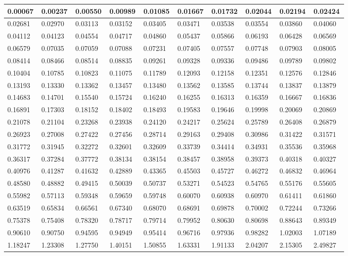 \begin{changemargin}{-4cm}{0cm}\small{%
\begin{tabular}{|p{0.08\linewidth}|p{0.08\linewidth}|p{0.08\linewidth}|p{0.08\linewidth}|p{0.08\linewidth}|p{0.08\linewidth}|p{0.08\linewidth}|p{0.08\linewidth}|p{0.08\linewidth}|p{0.08\linewidth}|}%
\hline%
0.00067&0.00237&0.00550&0.00989&0.01085&0.01667&0.01732&0.02044&0.02194&0.02424\\%
\hline%
0.02681&0.02970&0.03113&0.03152&0.03405&0.03471&0.03538&0.03554&0.03860&0.04060\\%
\hline%
0.04112&0.04123&0.04554&0.04717&0.04860&0.05437&0.05866&0.06193&0.06428&0.06569\\%
\hline%
0.06579&0.07035&0.07059&0.07088&0.07231&0.07405&0.07557&0.07748&0.07903&0.08005\\%
\hline%
0.08414&0.08466&0.08514&0.08835&0.09261&0.09328&0.09336&0.09486&0.09789&0.09802\\%
\hline%
0.10404&0.10785&0.10823&0.11075&0.11789&0.12093&0.12158&0.12351&0.12576&0.12846\\%
\hline%
0.13193&0.13330&0.13362&0.13457&0.13480&0.13562&0.13585&0.13744&0.13837&0.13879\\%
\hline%
0.14683&0.14701&0.15540&0.15724&0.16240&0.16255&0.16313&0.16359&0.16667&0.16836\\%
\hline%
0.16891&0.17303&0.18152&0.18402&0.18493&0.19583&0.19646&0.19998&0.20069&0.20869\\%
\hline%
0.21078&0.21104&0.23268&0.23938&0.24120&0.24217&0.25624&0.25789&0.26408&0.26879\\%
\hline%
0.26923&0.27008&0.27422&0.27456&0.28714&0.29163&0.29408&0.30986&0.31422&0.31571\\%
\hline%
0.31772&0.31945&0.32272&0.32601&0.32609&0.33739&0.34414&0.34931&0.35536&0.35968\\%
\hline%
0.36317&0.37284&0.37772&0.38134&0.38154&0.38457&0.38958&0.39373&0.40318&0.40327\\%
\hline%
0.40976&0.41287&0.41632&0.42889&0.43365&0.45503&0.45727&0.46272&0.46832&0.46964\\%
\hline%
0.48580&0.48882&0.49415&0.50039&0.50737&0.53271&0.54523&0.54765&0.55176&0.55605\\%
\hline%
0.55982&0.57113&0.59348&0.59659&0.59748&0.60070&0.60938&0.60970&0.61411&0.61860\\%
\hline%
0.63519&0.65834&0.66561&0.67340&0.68070&0.68691&0.69878&0.70002&0.72244&0.73266\\%
\hline%
0.75378&0.75408&0.78320&0.78717&0.79714&0.79952&0.80630&0.80698&0.88643&0.89349\\%
\hline%
0.90610&0.90750&0.94595&0.94949&0.95414&0.96716&0.97936&0.98282&1.02003&1.07189\\%
\hline%
1.18247&1.23308&1.27750&1.40151&1.50855&1.63331&1.91133&2.04207&2.15305&2.49827\\%
\hline%
\end{tabular}%
\newline%
\newline%
%
}\end{changemargin}%

